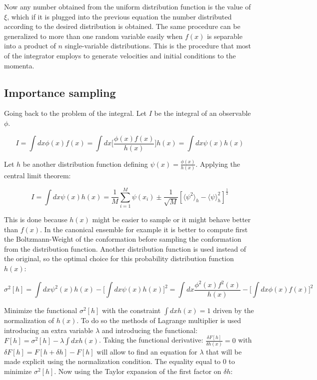		Now any number obtained from the uniform distribution function is the value of $\xi$, which if it is plugged into the previous equation the number distributed according to the desired distribution is obtained.
		The same procedure can be generalized to more than one random variable easily when $f(x)$ is separable into a product of $n$ single-variable distributions.
		This is the procedure that most of the integrator employs to generate velocities and initial conditions to the momenta.

	\subsection{Importance sampling}
	Going back to the problem of the integral.
	Let $I$ be the integral of an observable $\phi$.

	$$I = \int dx\phi(x)f(x) = \int dx\biggl[\frac{\phi(x)f(x)}{h(x)}\biggr]h(x) = \int dx\psi(x)h(x)$$

	Let $h$ be another distribution function defining $\psi(x) = \frac{\phi(x)}{h(x)}$.
	Applying the central limit theorem:

	$$I = \int dx\psi(x)h(x) = \frac{1}{M}\sum\limits_{i=1}^M\psi(x_i)\pm\frac{1}{\sqrt{M}}[\langle\psi^2\rangle_h-\langle\psi\rangle_h^2]^{\frac{1}{2}}$$

	This is done because $h(x)$ might be easier to sample or it might behave better than $f(x)$.
	In the canonical ensemble for example it is better to compute first the Boltzmann-Weight of the conformation before sampling the conformation from the distribution function.
	Another distribution function is used instead of the original, so the optimal choice for this probability distribution function $h(x)$:

	$$\sigma^2[h] = \int dx\psi^2(x)h(x) - \biggl[\int dx\psi(x)h(x)\biggr]^2 = \int dx\frac{\phi^2(x)f^2(x)}{h(x)}-\biggl[\int dx\phi(x)f(x)\biggr]^2$$

	Minimize the functional $\sigma^2[h]$ with the constraint $\int dx h(x) = 1$ driven by the normalization of $h(x)$.
	To do so the methods of	Lagrange multiplier is used introducing an extra variable $\lambda$ and introducing the functional: $F[h] = \sigma^2[h]-\lambda\int dxh(x)$.
	Taking the functional derivative: $\frac{\delta F[h]}{\delta h(x)} = 0$ with $\delta F[h] = F[h+\delta h]-F[h]$ will allow to find an equation for $\lambda$ that will be made explicit using the normalization condition.
	The equality equal to $0$ to minimize $\sigma^2[h]$.
	Now using the Taylor expansion of the first factor on $\delta h$:

